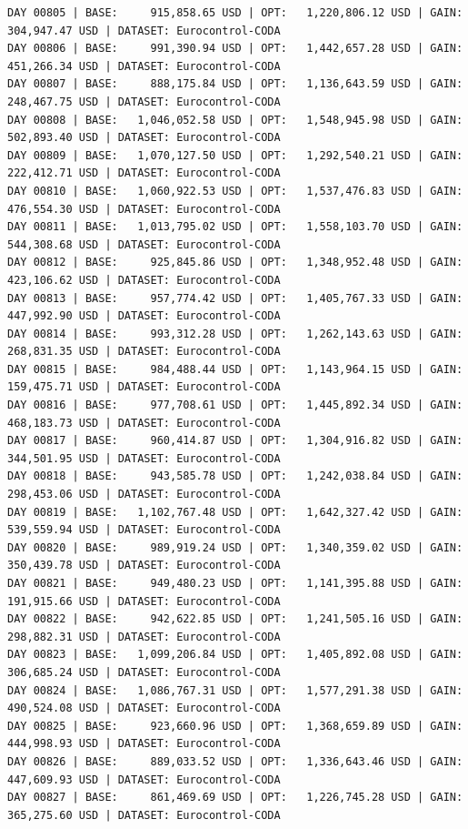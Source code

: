 \documentclass[11pt,a4paper]{article}
\begin{document}
\begin{verbatim}
DAY 00805 | BASE:     915,858.65 USD | OPT:   1,220,806.12 USD | GAIN: 304,947.47 USD | DATASET: Eurocontrol-CODA
DAY 00806 | BASE:     991,390.94 USD | OPT:   1,442,657.28 USD | GAIN: 451,266.34 USD | DATASET: Eurocontrol-CODA
DAY 00807 | BASE:     888,175.84 USD | OPT:   1,136,643.59 USD | GAIN: 248,467.75 USD | DATASET: Eurocontrol-CODA
DAY 00808 | BASE:   1,046,052.58 USD | OPT:   1,548,945.98 USD | GAIN: 502,893.40 USD | DATASET: Eurocontrol-CODA
DAY 00809 | BASE:   1,070,127.50 USD | OPT:   1,292,540.21 USD | GAIN: 222,412.71 USD | DATASET: Eurocontrol-CODA
DAY 00810 | BASE:   1,060,922.53 USD | OPT:   1,537,476.83 USD | GAIN: 476,554.30 USD | DATASET: Eurocontrol-CODA
DAY 00811 | BASE:   1,013,795.02 USD | OPT:   1,558,103.70 USD | GAIN: 544,308.68 USD | DATASET: Eurocontrol-CODA
DAY 00812 | BASE:     925,845.86 USD | OPT:   1,348,952.48 USD | GAIN: 423,106.62 USD | DATASET: Eurocontrol-CODA
DAY 00813 | BASE:     957,774.42 USD | OPT:   1,405,767.33 USD | GAIN: 447,992.90 USD | DATASET: Eurocontrol-CODA
DAY 00814 | BASE:     993,312.28 USD | OPT:   1,262,143.63 USD | GAIN: 268,831.35 USD | DATASET: Eurocontrol-CODA
DAY 00815 | BASE:     984,488.44 USD | OPT:   1,143,964.15 USD | GAIN: 159,475.71 USD | DATASET: Eurocontrol-CODA
DAY 00816 | BASE:     977,708.61 USD | OPT:   1,445,892.34 USD | GAIN: 468,183.73 USD | DATASET: Eurocontrol-CODA
DAY 00817 | BASE:     960,414.87 USD | OPT:   1,304,916.82 USD | GAIN: 344,501.95 USD | DATASET: Eurocontrol-CODA
DAY 00818 | BASE:     943,585.78 USD | OPT:   1,242,038.84 USD | GAIN: 298,453.06 USD | DATASET: Eurocontrol-CODA
DAY 00819 | BASE:   1,102,767.48 USD | OPT:   1,642,327.42 USD | GAIN: 539,559.94 USD | DATASET: Eurocontrol-CODA
DAY 00820 | BASE:     989,919.24 USD | OPT:   1,340,359.02 USD | GAIN: 350,439.78 USD | DATASET: Eurocontrol-CODA
DAY 00821 | BASE:     949,480.23 USD | OPT:   1,141,395.88 USD | GAIN: 191,915.66 USD | DATASET: Eurocontrol-CODA
DAY 00822 | BASE:     942,622.85 USD | OPT:   1,241,505.16 USD | GAIN: 298,882.31 USD | DATASET: Eurocontrol-CODA
DAY 00823 | BASE:   1,099,206.84 USD | OPT:   1,405,892.08 USD | GAIN: 306,685.24 USD | DATASET: Eurocontrol-CODA
DAY 00824 | BASE:   1,086,767.31 USD | OPT:   1,577,291.38 USD | GAIN: 490,524.08 USD | DATASET: Eurocontrol-CODA
DAY 00825 | BASE:     923,660.96 USD | OPT:   1,368,659.89 USD | GAIN: 444,998.93 USD | DATASET: Eurocontrol-CODA
DAY 00826 | BASE:     889,033.52 USD | OPT:   1,336,643.46 USD | GAIN: 447,609.93 USD | DATASET: Eurocontrol-CODA
DAY 00827 | BASE:     861,469.69 USD | OPT:   1,226,745.28 USD | GAIN: 365,275.60 USD | DATASET: Eurocontrol-CODA

\end{verbatim}
\end{document}

